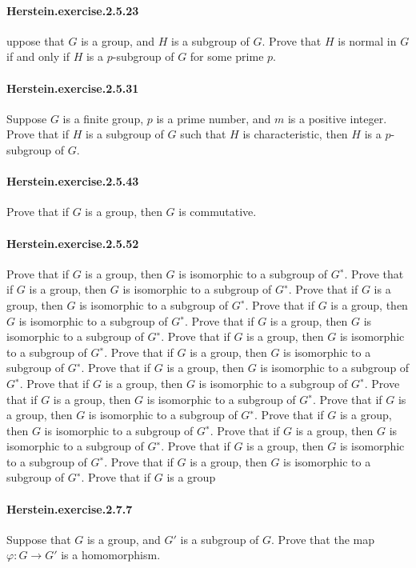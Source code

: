 \documentclass{article}
\begin{document}
\paragraph{Herstein.exercise.2.5.23} uppose that $G$ is a group, and $H$ is a subgroup of $G$. Prove that $H$ is normal in $G$ if and only if $H$ is a $p$-subgroup of $G$ for some prime $p$.

\paragraph{Herstein.exercise.2.5.31} Suppose $G$ is a finite group, $p$ is a prime number, and $m$ is a positive integer. Prove that if $H$ is a subgroup of $G$ such that $H$ is characteristic, then $H$ is a $p$-subgroup of $G$.

\paragraph{Herstein.exercise.2.5.43} Prove that if $G$ is a group, then $G$ is commutative.

\paragraph{Herstein.exercise.2.5.52} Prove that if $G$ is a group, then $G$ is isomorphic to a subgroup of $G^∗$. Prove that if $G$ is a group, then $G$ is isomorphic to a subgroup of $G^∗$. Prove that if $G$ is a group, then $G$ is isomorphic to a subgroup of $G^∗$. Prove that if $G$ is a group, then $G$ is isomorphic to a subgroup of $G^∗$. Prove that if $G$ is a group, then $G$ is isomorphic to a subgroup of $G^∗$. Prove that if $G$ is a group, then $G$ is isomorphic to a subgroup of $G^∗$. Prove that if $G$ is a group, then $G$ is isomorphic to a subgroup of $G^∗$. Prove that if $G$ is a group, then $G$ is isomorphic to a subgroup of $G^∗$. Prove that if $G$ is a group, then $G$ is isomorphic to a subgroup of $G^∗$. Prove that if $G$ is a group, then $G$ is isomorphic to a subgroup of $G^∗$. Prove that if $G$ is a group, then $G$ is isomorphic to a subgroup of $G^∗$. Prove that if $G$ is a group, then $G$ is isomorphic to a subgroup of $G^∗$. Prove that if $G$ is a group, then $G$ is isomorphic to a subgroup of $G^∗$. Prove that if $G$ is a group, then $G$ is isomorphic to a subgroup of $G^∗$. Prove that if $G$ is a group, then $G$ is isomorphic to a subgroup of $G^∗$. Prove that if $G$ is a group

\paragraph{Herstein.exercise.2.7.7} Suppose that $G$ is a group, and $G'$ is a subgroup of $G$. Prove that the map $φ: G \to G'$ is a homomorphism.
\end{document}
